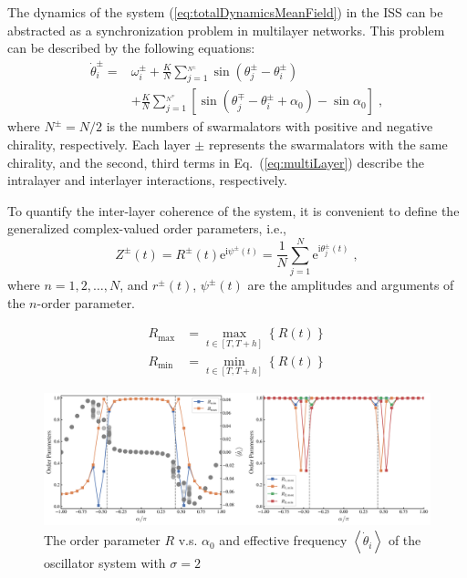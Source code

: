 \documentclass{article}
\begin{document}
The dynamics of the system (\ref{eq:totalDynamicsMeanField}) in the ISS can be abstracted as a synchronization problem in multilayer networks. This problem can be described by the following equations:
\begin{equation}
    \label{eq:multiLayer}
    \begin{aligned}
        \dot{\theta}_{i}^{\pm}=&\omega _{i}^{\pm}+\frac{K}{N}\sum_{j=1}^{_{N^{\pm}}}{\sin \left( \theta _{j}^{\pm}-\theta _{i}^{\pm} \right)}\\
        &+\frac{K}{N}\sum_{j=1}^{_{N^{\mp}}}{\left[ \sin \left( \theta _{j}^{\mp}-\theta _{i}^{\pm}+\alpha _0 \right) -\sin \alpha _0 \right]}\;,
    \end{aligned}
\end{equation}
where $N^{\pm}=N/2$ is the numbers of swarmalators with positive and negative chirality, respectively. 
Each layer $\pm$ represents the swarmalators with the same chirality, and the second, third terms in Eq.~(\ref{eq:multiLayer}) describe the intralayer and interlayer interactions, respectively.

To quantify the inter-layer coherence of the system, it is convenient to define the generalized complex-valued
order parameters, i.e.,
\begin{equation}
    \label{eq:orderParameter}
    Z^{\pm}\left( t \right) =R^{\pm}\left( t \right) \text{e}^{\text{i}\psi^{\pm}\left( t \right)}=\frac{1}{N}\sum_{j=1}^N{\text{e}^{\text{i}\theta _{j}^{\pm}\left( t \right)}}\;,
\end{equation}
where $n=1,2,\dots, N$, and $r^{\pm}\left( t \right)$, $\psi ^{\pm}\left( t \right)$ are the amplitudes and arguments of the $n$-order parameter.

\begin{subequations}
    \begin{align}
        R_{\max}&=\max_{t\in \left[ T,T+h \right]} \left\{ R\left( t \right) \right\} 
        \\
        R_{\min}&=\min_{t\in \left[ T,T+h \right]} \left\{ R\left( t \right) \right\} 
    \end{align}
\end{subequations}

\begin{figure}[H]
    \centering
    \includegraphics[width=1\textwidth]{figs/OrderParameter_R_l9.6_dO2.png}
    \caption{The order parameter $R$ v.s. $\alpha_0$ and effective frequency $\left<\dot{\theta}_i\right>$ of the oscillator system with $\sigma =2$}
\end{figure}
\end{document}
